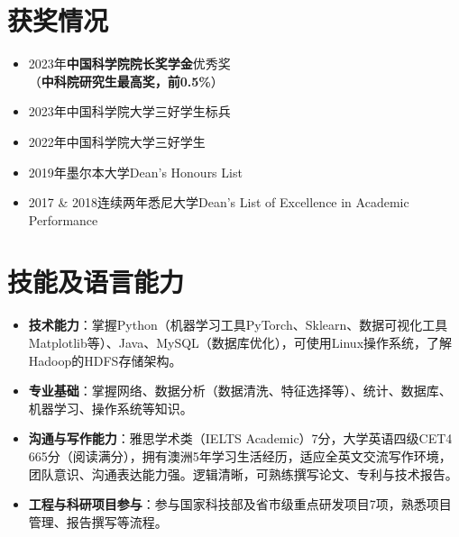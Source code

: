 \documentclass[UTF8,letterpaper,11pt]{article}
\begin{document}

\section{\textbf{获奖情况}}
\vspace{-5mm}
\begin{multicols}{2}
\begin{itemize}
  \setlength\itemsep{2.0pt}
  \item 2023年\textbf{中国科学院院长奖学金}优秀奖\\（\textbf{中科院研究生最高奖，前0.5\%}）
  \item 2023年中国科学院大学三好学生标兵
  \item 2022年中国科学院大学三好学生
  \item 2019年墨尔本大学Dean's Honours List
  \item 2017 \& 2018连续两年悉尼大学Dean's List of Excellence in Academic Performance
\end{itemize}
\end{multicols}




\section{\textbf{技能及语言能力}}

\begin{itemize}
  \setlength\itemsep{2.0pt}
  \item \textbf{技术能力}：掌握Python（机器学习工具PyTorch、Sklearn、数据可视化工具Matplotlib等）、Java、MySQL（数据库优化），可使用Linux操作系统，了解Hadoop的HDFS存储架构。
  \item \textbf{专业基础}：掌握网络、数据分析（数据清洗、特征选择等）、统计、数据库、机器学习、操作系统等知识。
  \item \textbf{沟通与写作能力}：雅思学术类（IELTS Academic）7分，大学英语四级CET4 665分（阅读满分），拥有澳洲5年学习生活经历，适应全英文交流写作环境，团队意识、沟通表达能力强。逻辑清晰，可熟练撰写论文、专利与技术报告。
  \item \textbf{工程与科研项目参与}：参与国家科技部及省市级重点研发项目7项，熟悉项目管理、报告撰写等流程。
\end{itemize}


\end{document}
